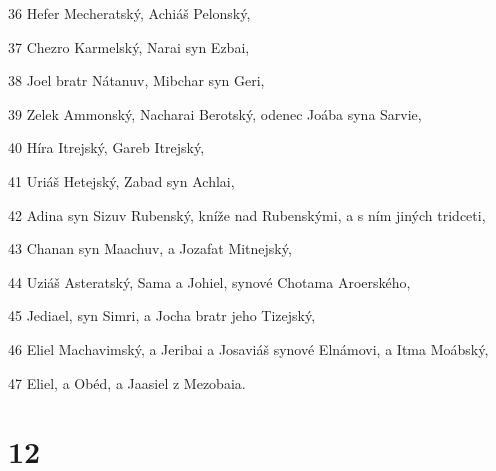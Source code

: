 \par 36 Hefer Mecheratský, Achiáš Pelonský,
\par 37 Chezro Karmelský, Narai syn Ezbai,
\par 38 Joel bratr Nátanuv, Mibchar syn Geri,
\par 39 Zelek Ammonský, Nacharai Berotský, odenec Joába syna Sarvie,
\par 40 Híra Itrejský, Gareb Itrejský,
\par 41 Uriáš Hetejský, Zabad syn Achlai,
\par 42 Adina syn Sizuv Rubenský, kníže nad Rubenskými, a s ním jiných tridceti,
\par 43 Chanan syn Maachuv, a Jozafat Mitnejský,
\par 44 Uziáš Asteratský, Sama a Johiel, synové Chotama Aroerského,
\par 45 Jediael, syn Simri, a Jocha bratr jeho Tizejský,
\par 46 Eliel Machavimský, a Jeribai a Josaviáš synové Elnámovi, a Itma Moábský,
\par 47 Eliel, a Obéd, a Jaasiel z Mezobaia.

\chapter{12}

